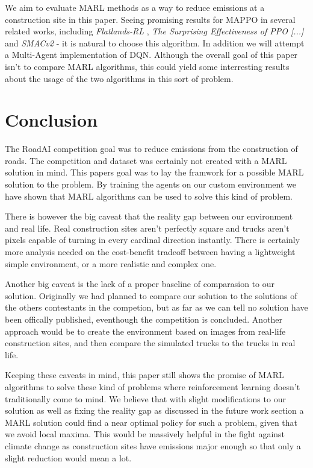 \documentclass[conference]{IEEEtran}
\begin{document}
We aim to evaluate MARL methods as a way to reduce \coo{} emissions at a construction site in this paper.
Seeing promising results for MAPPO in several related works, including \textit{Flatlands-RL} \cite{laurent2021flatland},
\textit{The Surprising Effectiveness of PPO [...]} \cite{yu2022surprising} and \textit{SMACv2} \cite{ellis2022smacv2}-
it is natural to choose this algorithm. In addition we will attempt a Multi-Agent implementation of DQN. Although the
overall goal of this paper isn't to compare MARL algorithms, this could yield some interresting results about the
usage of the two algorithms in this sort of problem.


\section{Conclusion}

The RoadAI competition goal was to reduce \coo{} emissions from the construction of roads.
The competition and dataset was certainly not created with a MARL solution in mind.
This papers goal was to lay the framwork for a possible MARL solution to the problem.
By training the agents on our custom environment we have shown that MARL algorithms can be used to solve
this  kind of problem.

There is however the big caveat that the reality gap between our environment and real life.
Real construction sites aren't perfectly square and trucks aren't pixels capable of turning in every
cardinal direction instantly. There is certainly more analysis needed on the cost-benefit tradeoff
between having a lightweight simple environment, or a more realistic and complex one.

Another big caveat is the lack of a proper baseline of comparasion to our solution.
Originally we had planned to compare our solution to the solutions of the others contestants in the
competion, but as far as we can tell no solution have been offically published, eventhough the competition
is concluded. Another approach would be to create the environment based on images from real-life
construction sites, and then compare the simulated trucks to the trucks in real life.

Keeping these caveats in mind, this paper still shows the promise of MARL algorithms to solve these kind of
problems where reinforcement learning doesn't traditionally come to mind. We believe that with slight modifications to our solution as well as fixing the reality gap as discussed in the future work section a MARL solution could find a near optimal policy for such a problem, given that we avoid local maxima. This would be massively helpful in the fight against climate change as construction sites have emissions major enough so that only a slight reduction would mean a lot.
\end{document}
